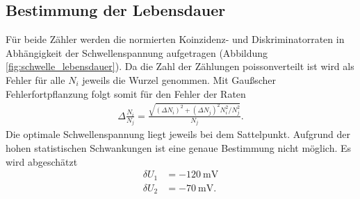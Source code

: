 \subsection{Bestimmung der Lebensdauer}
Für beide Zähler werden die normierten Koinzidenz- und Diskriminatorraten in Abhängigkeit der Schwellenspannung aufgetragen (Abbildung \ref{fig:schwelle_lebensdauer}). Da die Zahl der Zählungen poissonverteilt ist wird als Fehler für alle $N_i$ jeweils die Wurzel genommen. Mit Gaußscher Fehlerfortpflanzung folgt somit für den Fehler der Raten 
\begin{align*}
  \Delta \frac{N_i}{N_j}=\frac{\sqrt{(\Delta N_i)^2+(\Delta N_j)^2N_i^2/N_j^2}}{N_j}.
\end{align*} 
Die optimale Schwellenspannung liegt jeweils bei dem Sattelpunkt. Aufgrund der hohen statistischen Schwankungen ist eine genaue Bestimmung nicht möglich. Es wird abgeschätzt
\begin{align*}
  \delta U_1&=-\SI{120}{\milli\volt}\\
  \delta U_2&=-\SI{70}{\milli\volt}.
\end{align*} 

